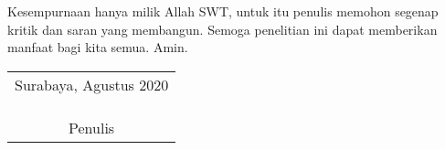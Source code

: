 Kesempurnaan hanya milik Allah SWT, untuk itu penulis memohon segenap kritik dan saran yang  membangun. Semoga penelitian ini dapat memberikan manfaat bagi kita semua. Amin.
\vspace{26pt}

\begin{flushright}
	\begin{tabular}[b]{c}
		Surabaya, Agustus 2020
		\\
		\\
		\\
		\\
		Penulis
	\end{tabular}
\end{flushright}